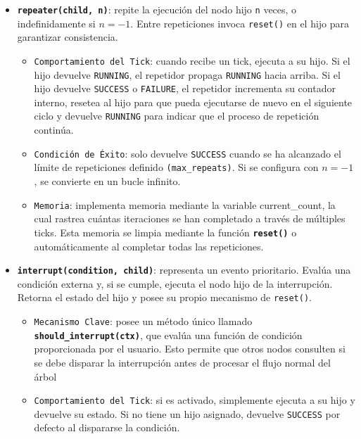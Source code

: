 \documentclass{prgrado}
\begin{document}
\begin{itemize}
    \item \textbf{\texttt{repeater(child, n)}}: repite la ejecución del nodo hijo \texttt{n} veces, o indefinidamente si \texttt{$n = -1$}. Entre repeticiones invoca \texttt{reset()} en el hijo para garantizar consistencia.
   
    \begin{itemize}
        \item \texttt{Comportamiento del Tick}: cuando recibe un tick, ejecuta a su hijo. Si el hijo devuelve \texttt{RUNNING}, el repetidor propaga \texttt{RUNNING} hacia arriba. Si el hijo devuelve \texttt{SUCCESS} o \texttt{FAILURE}, el repetidor incrementa su contador interno, resetea al hijo para que pueda ejecutarse de nuevo en el siguiente ciclo y devuelve \texttt{RUNNING} para indicar que el proceso de repetición continúa.
       
        \item \texttt{Condición de Éxito}: solo devuelve \texttt{SUCCESS} cuando se ha alcanzado el límite de repeticiones definido \texttt{(max\_repeats)}. Si se configura con \texttt{$n = -1$}, se convierte en un bucle infinito.

        \item \texttt{Memoria}: implementa memoria mediante la variable current\_count, la cual rastrea cuántas iteraciones se han completado a través de múltiples ticks. Esta memoria se limpia mediante la función \textbf{\texttt{reset()}} o automáticamente al completar todas las repeticiones.
    \end{itemize}
   
    \item \textbf{\texttt{interrupt(condition, child)}}: representa un evento prioritario. Evalúa una condición externa y, si se cumple, ejecuta el nodo hijo de la interrupción. Retorna el estado del hijo y posee su propio mecanismo de \texttt{reset()}.

    \begin{itemize}
        \item \texttt{Mecanismo Clave}: posee un método único llamado \textbf{\texttt{should\_interrupt(ctx)}}, que evalúa una función de condición proporcionada por el usuario. Esto permite que otros nodos consulten si se debe disparar la interrupción antes de procesar el flujo normal del árbol
   
        \item \texttt{Comportamiento del Tick}: si es activado, simplemente ejecuta a su hijo y devuelve su estado. Si no tiene un hijo asignado, devuelve \texttt{SUCCESS} por defecto al dispararse la condición.
       

\end{itemize}
\end{itemize}
\end{document}
